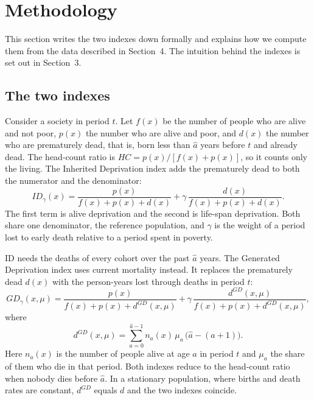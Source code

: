 \documentclass[12pt,a4paper]{article}
\newcommand{\ahat}{\hat{a}}
\begin{document}
\setcounter{section}{4}

\section{Methodology}\label{sec:methodology}

This section writes the two indexes down formally and explains how we compute them from the data described in Section~4. The intuition behind the indexes is set out in Section~3.

\subsection{The two indexes}\label{sec:meth-indexes}

Consider a society in period $t$. Let $f(x)$ be the number of people who are alive and not poor, $p(x)$ the number who are alive and poor, and $d(x)$ the number who are prematurely dead, that is, born less than $\ahat$ years before $t$ and already dead. The head-count ratio is $HC = p(x)/[f(x)+p(x)]$, so it counts only the living. The Inherited Deprivation index adds the prematurely dead to both the numerator and the denominator:
\begin{equation}\label{eq:id}
ID_{\gamma}(x) = \frac{p(x)}{f(x)+p(x)+d(x)} + \gamma\,\frac{d(x)}{f(x)+p(x)+d(x)}.
\end{equation}
The first term is alive deprivation and the second is life-span deprivation. Both share one denominator, the reference population, and $\gamma$ is the weight of a period lost to early death relative to a period spent in poverty.

ID needs the deaths of every cohort over the past $\ahat$ years. The Generated Deprivation index uses current mortality instead. It replaces the prematurely dead $d(x)$ with the person-years lost through deaths in period $t$:
\begin{equation}\label{eq:gd}
GD_{\gamma}(x,\mu) = \frac{p(x)}{f(x)+p(x)+d^{GD}(x,\mu)} + \gamma\,\frac{d^{GD}(x,\mu)}{f(x)+p(x)+d^{GD}(x,\mu)},
\end{equation}
where
\begin{equation}\label{eq:dgd}
d^{GD}(x,\mu) = \sum_{a=0}^{\ahat-1} n_a(x)\,\mu_a\,\bigl(\ahat-(a+1)\bigr).
\end{equation}
Here $n_a(x)$ is the number of people alive at age $a$ in period $t$ and $\mu_a$ the share of them who die in that period. Both indexes reduce to the head-count ratio when nobody dies before $\ahat$. In a stationary population, where births and death rates are constant, $d^{GD}$ equals $d$ and the two indexes coincide.
\end{document}
